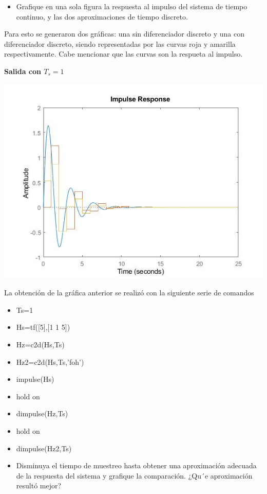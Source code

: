 \begin{itemize}
	\item Grafique en una sola figura la respuesta al impulso del sistema de tiempo continuo, y las dos aproximaciones
	de tiempo discreto.
\end{itemize}

Para esto se generaron dos gráficas: una sin diferenciador discreto y una con diferenciador discreto, siendo representadas por las curvas roja y amarilla respectivamente. Cabe mencionar que las curvas son la respueta al impulso.

\noindent \textbf{Salida con $T_s=1$}

\noindent \includegraphics[scale=0.6]{./img2/SalidaTs1DosHz}

La obtención de la gráfica anterior se realizó con la siguiente serie de comandos

\begin{itemize}
\item Ts=1
\item Hs=tf([5],[1 1 5])
\item Hz=c2d(Hs,Ts)
\item Hz2=c2d(Hs,Ts,'foh')
\item impulse(Hs)
\item hold on
\item dimpulse(Hz,Ts)
\item hold on
\item dimpulse(Hz2,Ts)
\end{itemize}

\begin{itemize}
	\item Disminuya el tiempo de muestreo hasta obtener una aproximación adecuada de la respuesta del sistema
	y grafique la comparación. ¿Qu´e aproximación resultó mejor?
\end{itemize}

